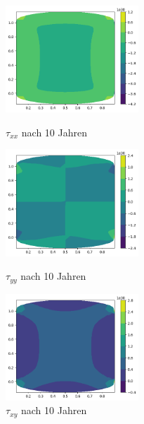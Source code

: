 \documentclass[12pt]{article}
\begin{document}
\begin{figure}[H]
	\begin{minipage}[hbt]{0.25\textwidth}
		\centering
		\includegraphics[width=5cm]{A1_tauxx.png}
		\caption{$\tau_{xx}$ nach 10 Jahren}
		\label{Bild1}
	\end{minipage}
	\hfill
	\begin{minipage}[hbt]{0.25\textwidth}
		\centering
		\includegraphics[width=5cm]{A1_tauyy.png}
		\caption{$\tau_{yy}$ nach 10 Jahren}
		\label{Bild2}
	\end{minipage}
	\hfill
	\begin{minipage}[hbt]{0.25\textwidth}
		\centering
		\includegraphics[width=5cm]{A1_tauxy.png}
		\caption{$\tau_{xy}$ nach 10 Jahren}
		\label{Bild2}
	\end{minipage}
\end{figure}
\end{document}
